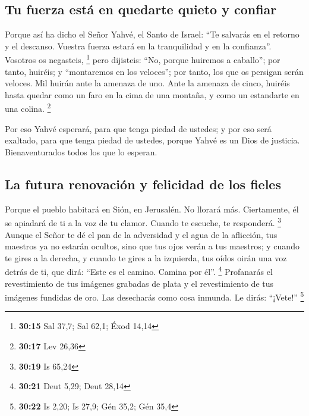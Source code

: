 \begin{paracol}{2}
\hypertarget{tu-fuerza-estuxe1-en-quedarte-quieto-y-confiar}{%
\subsection{Tu fuerza está en quedarte quieto y
confiar}\label{tu-fuerza-estuxe1-en-quedarte-quieto-y-confiar}}

 Porque así ha dicho el Señor Yahvé, el Santo de Israel:
``Te salvarás en el retorno y el descanso. Vuestra fuerza estará en la
tranquilidad y en la confianza''. Vosotros os negasteis, \footnote{\textbf{30:15}
  Sal 37,7; Sal 62,1; Éxod 14,14}  pero dijisteis: ``No,
porque huiremos a caballo''; por tanto, huiréis; y ``montaremos en los
veloces''; por tanto, los que os persigan serán veloces. 
Mil huirán ante la amenaza de uno. Ante la amenaza de cinco, huiréis
hasta quedar como un faro en la cima de una montaña, y como un
estandarte en una colina. \footnote{\textbf{30:17} Lev 26,36}

 Por eso Yahvé esperará, para que tenga piedad de
ustedes; y por eso será exaltado, para que tenga piedad de ustedes,
porque Yahvé es un Dios de justicia. Bienaventurados todos los que lo
esperan.

\hypertarget{la-futura-renovaciuxf3n-y-felicidad-de-los-fieles}{%
\subsection{La futura renovación y felicidad de los
fieles}\label{la-futura-renovaciuxf3n-y-felicidad-de-los-fieles}}

 Porque el pueblo habitará en Sión, en Jerusalén. No
llorará más. Ciertamente, él se apiadará de ti a la voz de tu clamor.
Cuando te escuche, te responderá. \footnote{\textbf{30:19} Is 65,24}
 Aunque el Señor te dé el pan de la adversidad y el agua
de la aflicción, tus maestros ya no estarán ocultos, sino que tus ojos
verán a tus maestros;  y cuando te gires a la derecha, y
cuando te gires a la izquierda, tus oídos oirán una voz detrás de ti,
que dirá: ``Este es el camino. Camina por él''. \footnote{\textbf{30:21}
  Deut 5,29; Deut 28,14}  Profanarás el revestimiento de
tus imágenes grabadas de plata y el revestimiento de tus imágenes
fundidas de oro. Las desecharás como cosa inmunda. Le dirás: ``¡Vete!''
\footnote{\textbf{30:22} Is 2,20; Is 27,9; Gén 35,2; Gén 35,4}


\end{paracol}
